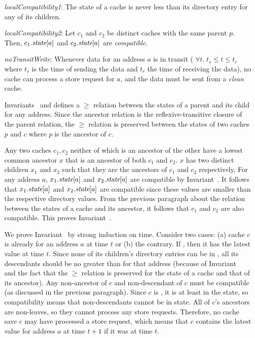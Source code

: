 \begin{inv}
\textit{localCompatibility1}:
The state of a cache is never less than its directory entry for any of
its children.
\label{localCompatibility1}
\end{inv}
\begin{inv}
\textit{localCompatibility2}: Let $c_1$ and $c_2$ be distinct caches with the
same parent $p$. Then, $c_1.\textit{state}[a]$ and $c_2.\textit{state}[a]$ are
\textit{compatible}.
\label{localCompatibility2}
\end{inv}

\begin{inv}
\textit{noTransitWrite}: Whenever data for an address $a$ is in transit (\ie{}
$\forall t. \; t_s \le t \le t_r$ where $t_s$ is the time of sending the data and
$t_r$ the time of receiving the data), no cache can process a store request for
$a$, and the data must be sent from a \textit{clean} cache.
\label{noTransitWrite}
\end{inv}

Invariants~ and  defines a
$\ge$ relation between the states of a parent and its child for any address.
Since the ancestor relation is the reflexive-transitive closure of the parent
relation, the $\ge$ relation is preserved between the states of two caches $p$
and $c$ where $p$ is the ancestor of $c$.

Any two caches $c_1, c_2$ neither of which is an ancestor of the other have a
lowest common ancestor $x$ that is an ancestor of both $c_1$ and $c_2$. $x$
has two distinct children $x_1$ and $x_2$ such that they are the ancestors of
$c_1$ and $c_2$ respectively. For any address $a$, $x_1.\textit{state}[a]$ and
$x_2.\textit{state}[a]$ are compatible by 
Invariant~. It follows that $x_1.\textit{state}[a]$ and
$x_2.\textit{state}[a]$ are compatible since these values are smaller than the
respective directory values. From the previous paragraph about the relation
between the states of a cache and its ancestor, it follows that $c_1$ and $c_2$
are also compatible. This proves Invariant~.

We prove Invariant~ by strong induction on time. Consider
two cases: (a) cache $c$ is already \clean{} for an address $a$ at time $t$ or
(b) the contrary.  If \clean{}, then it has the latest value at time $t$. Since
none of its children's directory entries can be in \Mo{}, all its descendants
should be no greater than \Sh{} for that address (because of Invariant~
 and the fact that the $\ge$ relation is preserved for the
state of a cache and that of its ancestor). Any non-ancestor of $c$ and
non-descendant of $c$ must be compatible (as discussed in the previous
paragraph).  Since $c$ is \clean, it is at least in the \Sh{} state, so
compatibility means that non-descendants cannot be in \Mo{} state. All of
$c$'s ancestors are non-leaves, so they cannot process any store requests.
Therefore, no cache save $c$ may have processed a store request, which means that
$c$ contains the latest value for address $a$ at time $t+1$ if it was \clean{}
at time $t$.

